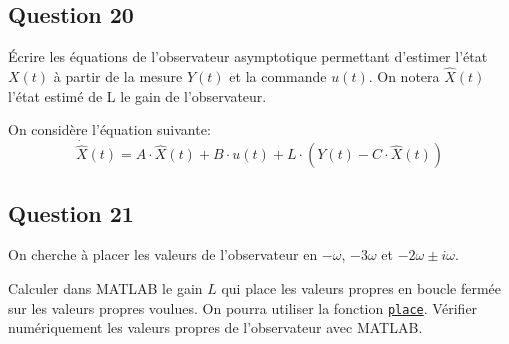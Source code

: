 \documentclass[class=article, crop=false]{standalone}
\begin{document}
\newpage
\subsection{Question 20}
\begin{exercise}
    Écrire les équations de l'observateur asymptotique permettant d'estimer l'état $X(t)$ à partir de la mesure $Y(t)$ et la commande $u(t)$. On notera $\hat{X}(t)$ l'état estimé de L le gain de l'observateur.
\end{exercise}
\begin{resolution}
    On considère l'équation suivante:
    \begin{equation}
        \dot{\hat{X}}(t) = A \cdot \hat{X}(t) + B \cdot u(t) + L \cdot (Y(t) - C \cdot \hat{X}(t))
    \end{equation}
\end{resolution}

\newpage
\subsection{Question 21}
On cherche à placer les valeurs de l'observateur en $-\omega$, $-3\omega$ et $-2\omega \pm i\omega$.
\begin{exercise}
    Calculer dans MATLAB le gain $L$ qui place les valeurs propres en boucle fermée sur les valeurs propres voulues. On pourra utiliser la fonction \href{https://www.mathworks.com/help/control/ref/place.html}{\texttt{place}}. Vérifier numériquement les valeurs propres de l'observateur avec MATLAB.
\end{exercise}
\begin{resolution}
\end{resolution}

\newpage
\end{document}
